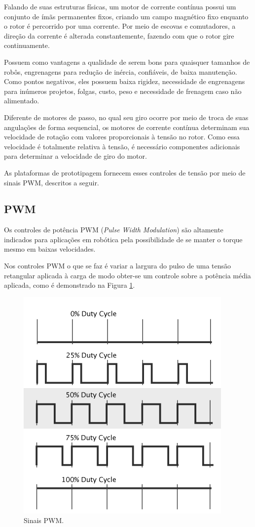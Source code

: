 \documentclass[portugues, brazil, a4paper,12pt]{article}
\begin{document}
			Falando de suas estruturas físicas, um motor de corrente contínua possui um conjunto de ímãs permanentes fixos, criando um campo magnético fixo enquanto o rotor é percorrido por uma corrente. Por meio de escovas e comutadores, a direção da corrente é alterada constantemente, fazendo com que o rotor gire continuamente. 

			Possuem como vantagens a qualidade de serem bons para quaisquer tamanhos de robôs, engrenagens para redução de inércia, confiáveis, de baixa manutenção. Como pontos negativos, eles possuem baixa rigidez, necessidade de engrenagens para inúmeros projetos, folgas, custo, peso e necessidade de frenagem caso não alimentado.

			Diferente de motores de passo, no qual seu giro ocorre por meio de troca de suas angulações de forma sequencial, os motores de corrente contínua determinam sua velocidade de rotação com valores proporcionais à tensão no rotor. Como essa velocidade é totalmente relativa à tensão, é necessário componentes adicionais para determinar a velocidade de giro do motor. 
            
            As plataformas de prototipagem fornecem esses controles de tensão por meio de sinais PWM, descritos a seguir.

		\subsection{PWM}
			Os controles de potência PWM (\textit{Pulse Width Modulation}) são altamente indicados para aplicações em robótica pela possibilidade de se manter o torque mesmo em baixas velocidades. 

			Nos controles PWM o que se faz é variar a largura do pulso de uma tensão retangular aplicada à carga de modo obter-se um controle sobre a potência média aplicada, como é demonstrado na Figura \ref{fig:pwm}.

			\begin{figure}[h]
				\centering
				\includegraphics[width=0.5\linewidth]{img/math-pwm.png}
				\caption{Sinais PWM.}
				\label{fig:pwm}
			\end{figure}
\end{document}
